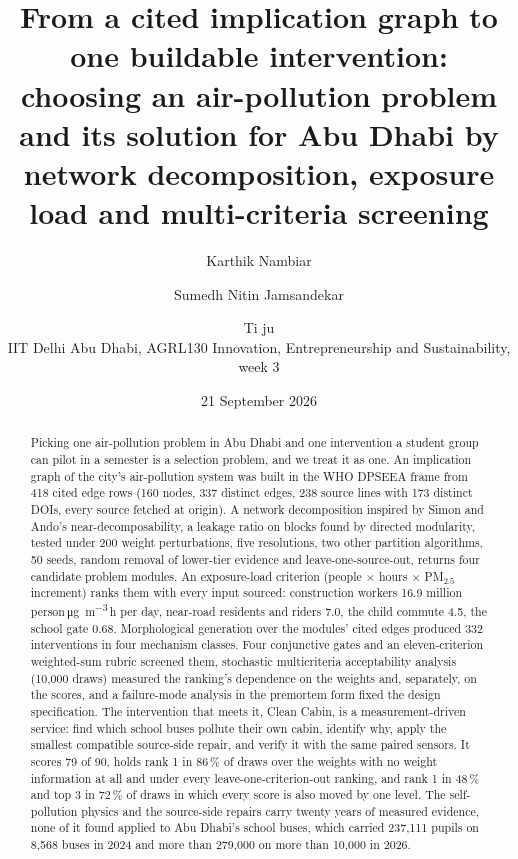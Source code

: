 \documentclass[10pt,a4paper]{article}
\title{\Large\bfseries From a cited implication graph to one buildable intervention:\\ choosing an air-pollution problem and its solution for Abu Dhabi by network decomposition, exposure load and multi-criteria screening}
\author{Karthik Nambiar \and Sumedh Nitin Jamsandekar \and Ti\kern0pt ju\\[4pt]
\normalsize IIT Delhi Abu Dhabi, AGRL130 Innovation, Entrepreneurship and Sustainability, week 3}
\date{\normalsize 21 September 2026}
\newcommand{\ugm}{\si{\micro\gram\per\cubic\metre}}
\begin{document}
\maketitle

\begin{abstract}
\noindent Picking one air-pollution problem in Abu Dhabi and one intervention a student group can pilot in a semester is a selection problem, and we treat it as one. An implication graph of the city's air-pollution system was built in the WHO DPSEEA frame from 418 cited edge rows (160 nodes, 337 distinct edges, 238 source lines with 173 distinct DOIs, every source fetched at origin). A network decomposition inspired by Simon and Ando's near-decomposability, a leakage ratio on blocks found by directed modularity, tested under 200 weight perturbations, five resolutions, two other partition algorithms, 50 seeds, random removal of lower-tier evidence and leave-one-source-out, returns four candidate problem modules. An exposure-load criterion (people \(\times\) hours \(\times\) PM\(_{2.5}\) increment) ranks them with every input sourced: construction workers \num{16.9} million person\,\ugm\,h per day, near-road residents and riders \num{7.0}, the child commute \num{4.5}, the school gate \num{0.68}. Morphological generation over the modules' cited edges produced 332 interventions in four mechanism classes. Four conjunctive gates and an eleven-criterion weighted-sum rubric screened them, stochastic multicriteria acceptability analysis (10,000 draws) measured the ranking's dependence on the weights and, separately, on the scores, and a failure-mode analysis in the premortem form fixed the design specification. The intervention that meets it, Clean Cabin, is a measurement-driven service: find which school buses pollute their own cabin, identify why, apply the smallest compatible source-side repair, and verify it with the same paired sensors. It scores 79 of 90, holds rank 1 in 86\,\% of draws over the weights with no weight information at all and under every leave-one-criterion-out ranking, and rank 1 in 48\,\% and top 3 in 72\,\% of draws in which every score is also moved by one level. The self-pollution physics and the source-side repairs carry twenty years of measured evidence, none of it found applied to Abu Dhabi's school buses, which carried 237,111 pupils on 8,568 buses in 2024 and more than 279,000 on more than 10,000 in 2026.
\end{abstract}
\end{document}
